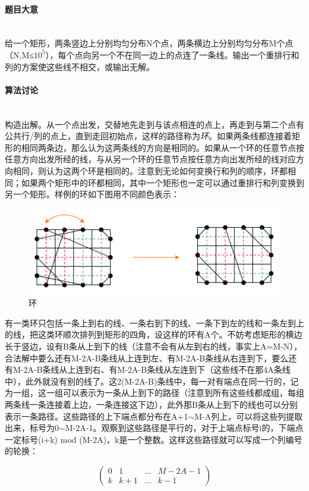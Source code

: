 \documentclass[UTF8]{ctexart}
\newcommand{\myparagraph}[1]{\paragraph{#1}\mbox{}\\}
\theoremstyle{nonumberplain}
\begin{document}
		\myparagraph{题目大意}
			
			给一个矩形，两条竖边上分别均匀分布N个点，两条横边上分别均匀分布M个点（N,M≤$10^5$），每个点向另一个不在同一边上的点连了一条线。输出一个重排行和列的方案使这些线不相交，或输出无解。
			
		\myparagraph{算法讨论}
		
			构造出解。从一个点出发，交替地先走到与该点相连的点上，再走到与第二个点有公共行/列的点上，直到走回初始点，这样的路径称为\emph{环}。如果两条线都连接着矩形的相同两条边，那么认为这两条线的方向是相同的。如果从一个环的任意节点按任意方向出发所经的线，与从另一个环的任意节点按任意方向出发所经的线对应方向相同，则认为这两个环是相同的。注意到无论如何变换行和列的顺序，环都相同；如果两个矩形中的环都相同，其中一个矩形也一定可以通过重排行和列变换到另一个矩形。样例的环如下图用不同颜色表示：
			
			\begin{figure}[ht]
				\centering
				\includegraphics[width=\textwidth]{fig269e_1.jpg}
				\caption{环}
			\end{figure}
			
			有一类环只包括一条上到右的线、一条右到下的线、一条下到左的线和一条左到上的线，把这类环顺次排列到矩形的四角，设这样的环有A个。不妨考虑矩形的横边长于竖边，设有B条从上到下的线（注意不会有从左到右的线，事实上A=M-N），合法解中要么还有M-2A-B条线从上连到左、有M-2A-B条线从右连到下，要么还有M-2A-B条线从上连到右、有M-2A-B条线从左连到下（这些线不在那4A条线中），此外就没有别的线了。这2(M-2A-B)条线中，每一对有端点在同一行的，记为一组，这一组可以表示为一条从上到下的路径（注意到所有这些线都成组，每组两条线一条连接着上边，一条连接这下边），此外那B条从上到下的线也可以分别表示一条路径。这些路径的上下端点都分布在A+1$\sim$M-A列上，可以将这些列提取出来，标号为0$\sim$M-2A-1。观察到这些路径是平行的，对于上端点标号i的，下端点一定标号(i+k) mod (M-2A)，k是一个整数。这样这些路径就可以写成一个列编号的轮换：
			
			$$\begin{pmatrix} 0 & 1 & ... & M-2A-1 \\ k & k+1 & ... & k-1 \end{pmatrix}$$
			
\end{document}
